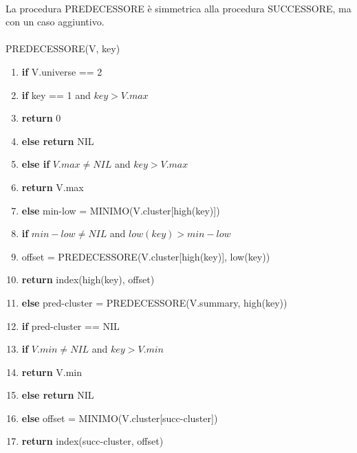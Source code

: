 \documentclass{article}
\begin{document}
\begin{flushleft}
            ~\\La procedura PREDECESSORE è simmetrica alla procedura SUCCESSORE, ma con un caso aggiuntivo.\\
            ~\\PREDECESSORE(V, key)
            \begin{enumerate}
                \item \textbf{if} V.universe == 2
                \item \hspace{10pt} \textbf{if} key == 1 and $key > V.max$
                \item \hspace{30pt} \textbf{return} 0
                \item \hspace{10pt} \textbf{else return} NIL
                \item \textbf{else if} $V.max \neq NIL$ and $ key > V.max$ 
                \item \hspace{10pt} \textbf{return} V.max
                \item \textbf{else} min-low = MINIMO(V.cluster[high(key)])
                \item \hspace{10pt} \textbf{if} $min-low \neq NIL$ and $low(key) > min-low$
                \item \hspace{30pt} offset = PREDECESSORE(V.cluster[high(key)], low(key))
                \item \hspace{30pt} \textbf{return} index(high(key), offset)
                \item \hspace{10pt} \textbf{else} pred-cluster = PREDECESSORE(V.summary, high(key))
                \item \hspace{30pt} \textbf{if} pred-cluster == NIL
                \item \hspace{50pt} \textbf{if} $V.min \neq NIL$ and $key > V.min$
                \item \hspace{70pt} \textbf{return} V.min
                \item \hspace{50pt} \textbf{else return} NIL
                \item \hspace{30pt} \textbf{else} offset = MINIMO(V.cluster[succ-cluster])
                \item \hspace{50pt} \textbf{return} index(succ-cluster, offset)
            \end{enumerate}
            

\end{flushleft}
\end{document}
